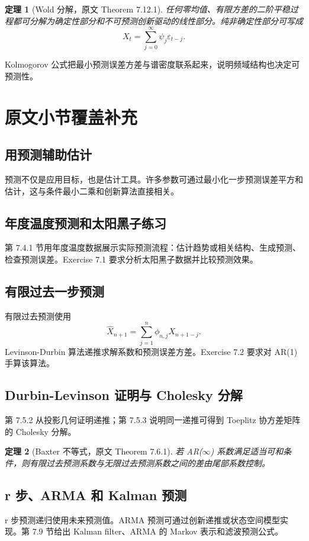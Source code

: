 \documentclass[11pt,a4paper]{ctexart}
\newtheorem{theorem}{定理}[section]
\begin{document}
\begin{theorem}[Wold 分解，原文 Theorem 7.12.1]
任何零均值、有限方差的二阶平稳过程都可分解为确定性部分和不可预测创新驱动的线性部分。纯非确定性部分可写成
\[
  X_t=\sum_{j=0}^{\infty}\psi_j\varepsilon_{t-j}.
\]
\end{theorem}

Kolmogorov 公式把最小预测误差方差与谱密度联系起来，说明频域结构也决定可预测性。

\section{原文小节覆盖补充}

\subsection{用预测辅助估计}
预测不仅是应用目标，也是估计工具。许多参数可通过最小化一步预测误差平方和估计，这与条件最小二乘和创新算法直接相关。

\subsection{年度温度预测和太阳黑子练习}
第 7.4.1 节用年度温度数据展示实际预测流程：估计趋势或相关结构、生成预测、检查预测误差。Exercise 7.1 要求分析太阳黑子数据并比较预测效果。

\subsection{有限过去一步预测}
有限过去预测使用
\[
  \hat X_{n+1}=\sum_{j=1}^n\phi_{n,j}X_{n+1-j}.
\]
Levinson-Durbin 算法递推求解系数和预测误差方差。Exercise 7.2 要求对 AR(1) 手算该算法。

\subsection{Durbin-Levinson 证明与 Cholesky 分解}
第 7.5.2 从投影几何证明递推；第 7.5.3 说明同一递推可得到 Toeplitz 协方差矩阵的 Cholesky 分解。

\begin{theorem}[Baxter 不等式，原文 Theorem 7.6.1]
若 AR(\(\infty\)) 系数满足适当可和条件，则有限过去预测系数与无限过去预测系数之间的差由尾部系数控制。
\end{theorem}

\subsection{r 步、ARMA 和 Kalman 预测}
r 步预测递归使用未来预测值。ARMA 预测可通过创新递推或状态空间模型实现。第 7.9 节给出 Kalman filter、ARMA 的 Markov 表示和滤波预测公式。
\end{document}
